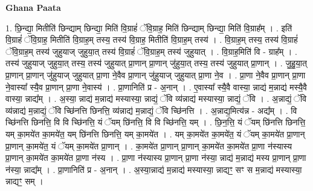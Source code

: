 \documentclass[17pt]{extarticle}
\begin{document}
\textbf{Ghana Paata } \newline

1. छि॒न्द्या॒ मितीति॑ छिन्द्याम् छिन्द्या॒ मिति॑ वि॒ग्राहं॑ ॅवि॒ग्राह॒ मिति॑ छिन्द्याम् छिन्द्या॒ मिति॑ वि॒ग्राह᳚म् । . इति॑ वि॒ग्राहं॑ ॅवि॒ग्राह॒ मितीति॑ वि॒ग्राह॒म् तस्य॒ तस्य॑ वि॒ग्राह॒ मितीति॑ वि॒ग्राह॒म् तस्य॑ । . वि॒ग्राह॒म् तस्य॒ तस्य॑ वि॒ग्राहं॑ ॅवि॒ग्राह॒म् तस्य॑ जुहुयाज् जुहुया॒त् तस्य॑ वि॒ग्राहं॑ ॅवि॒ग्राह॒म् तस्य॑ जुहुयात् । . वि॒ग्राह॒मिति॑ वि - ग्राह᳚म् । . तस्य॑ जुहुयाज् जुहुया॒त् तस्य॒ तस्य॑ जुहुयात् प्रा॒णान् प्रा॒णान् जु॑हुया॒त् तस्य॒ तस्य॑ जुहुयात् प्रा॒णान् । . जु॒हु॒या॒त् प्रा॒णान् प्रा॒णान् जु॑हुयाज् जुहुयात् प्रा॒णा ने॒वैव प्रा॒णान् जु॑हुयाज् जुहुयात् प्रा॒णा ने॒व । . प्रा॒णा ने॒वैव प्रा॒णान् प्रा॒णा ने॒वास्या᳚ स्यै॒व प्रा॒णान् प्रा॒णा ने॒वास्य॑ । . प्रा॒णानिति॑ प्र - अ॒नान् । . ए॒वास्या᳚ स्यै॒वै वास्या॒ न्नाद्य॑ म॒न्नाद्य॑ मस्यै॒वै वास्या॒ न्नाद्य᳚म् । . अ॒स्या॒ न्नाद्य॑ म॒न्नाद्य॑ मस्यास्या॒ न्नाद्यं॒ ॅवि व्य॑न्नाद्य॑ मस्यास्या॒ न्नाद्यं॒ ॅवि । . अ॒न्नाद्यं॒ ॅवि व्य॑न्नाद्य॑ म॒न्नाद्यं॒ ॅवि च्छि॑नत्ति छिनत्ति॒ व्य॑न्नाद्य॑ म॒न्नाद्यं॒ ॅवि च्छि॑नत्ति । . अ॒न्नाद्य॒मित्य॑न्न - अद्य᳚म् । . वि च्छि॑नत्ति छिनत्ति॒ वि वि च्छि॑नत्ति॒ यं ॅयम् छि॑नत्ति॒ वि वि च्छि॑नत्ति॒ यम् । . छि॒न॒त्ति॒ यं ॅयम् छि॑नत्ति छिनत्ति॒ यम् का॒मये॑त का॒मये॑त॒ यम् छि॑नत्ति छिनत्ति॒ यम् का॒मये॑त । . यम् का॒मये॑त का॒मये॑त॒ यं ॅयम् का॒मये॑त प्रा॒णान् प्रा॒णान् का॒मये॑त॒ यं ॅयम् का॒मये॑त प्रा॒णान् । . का॒मये॑त प्रा॒णान् प्रा॒णान् का॒मये॑त का॒मये॑त प्रा॒णा न॑स्यास्य प्रा॒णान् का॒मये॑त का॒मये॑त प्रा॒णा न॑स्य । . प्रा॒णा न॑स्यास्य प्रा॒णान् प्रा॒णा न॑स्या॒ न्नाद्य॑ म॒न्नाद्य॑ मस्य प्रा॒णान् प्रा॒णा न॑स्या॒ न्नाद्य᳚म् । . प्रा॒णानिति॑ प्र - अ॒नान् । . अ॒स्या॒न्नाद्य॑ म॒न्नाद्य॑ मस्यास्या॒ न्नाद्यꣳ॒॒ सꣳ स म॒न्नाद्य॑ मस्यास्या॒ न्नाद्यꣳ॒॒ सम् । \newline
\end{document}
